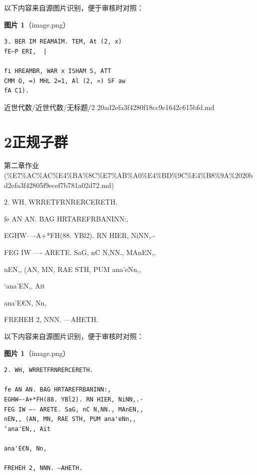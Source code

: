 \begin{note}
以下内容来自源图片识别，便于审核时对照：

\textbf{图片 1}（image.png）
\begin{Verbatim}[fontsize=\small]
3. BER IM REAMAIM. TEM, At (2, x)
fE—P ERI,  |

fi HREAMBR, WAR x ISHAM S, ATT
CMM O, =) MHL 2=1, Al (2, ») SF aw
fA C1).
\end{Verbatim}

\end{note}

\begin{note}[来源路径]

近世代数/近世代数/无标题/2 20ad2efa3f4280f18cc9e1642c615bfd.md

\end{note}

\section*{2正规子群}

\begin{note}[来源上级主题]

第二章作业 (\%E7\%AC\%AC\%E4\%BA\%8C\%E7\%AB\%A0\%E4\%BD\%9C\%E4\%B8\%9A\%2020bd2efa3f42805f9ecef7b781a02d72.md)

\end{note}

\begin{homework}

2. WH, WRRETFRNRERCERETH.

fe AN AN. BAG HRTAREFRBANINN:,

EGHW—-A+*FH(88. YBl2). RN HIER, NiNN,.-

FEG IW —- ARETE. SaG, nC N,NN., MAnEN,,

nEN,, (AN, MN, RAE STH, PUM ana'eNn,,

‘ana'EN,, Ait

ana'E€N, Nn,

FREHEH 2, NNN. —AHETH.

\end{homework}

\begin{note}
以下内容来自源图片识别，便于审核时对照：

\textbf{图片 1}（image.png）
\begin{Verbatim}[fontsize=\small]
2. WH, WRRETFRNRERCERETH.

fe AN AN. BAG HRTAREFRBANINN:,
EGHW—-A+*FH(88. YBl2). RN HIER, NiNN,.-
FEG IW —- ARETE. SaG, nC N,NN., MAnEN,,
nEN,, (AN, MN, RAE STH, PUM ana'eNn,,
‘ana'EN,, Ait

ana'E€N, Nn,

FREHEH 2, NNN. —AHETH.
\end{Verbatim}

\end{note}

